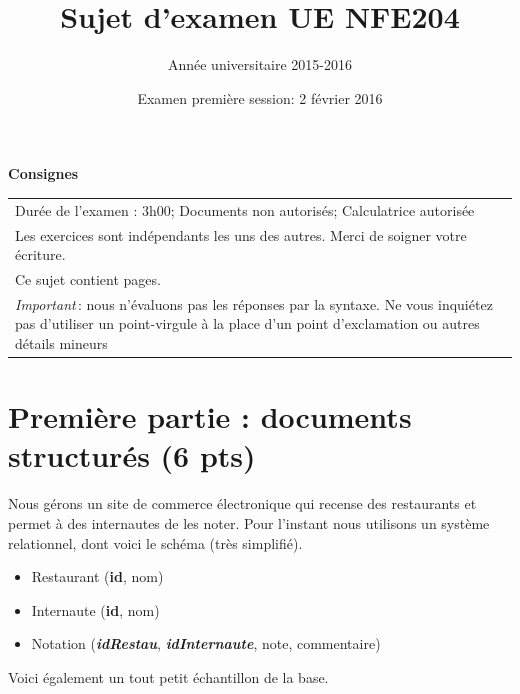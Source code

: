 \documentclass[10pt,a4paper]{article}
\begin{document}
\title{Sujet d'examen UE NFE204}
\author{Année universitaire 2015-2016}
\date{Examen première session: 2 février 2016}

\maketitle

\begin{center}
{\bf \Large Consignes}\\
\begin{tabular}{| p{15cm} |}
\hline
Dur\'ee de l'examen : 3h00; Documents non autoris\'es;  Calculatrice autoris\'ee\\

Les exercices sont indépendants les uns des autres. Merci de soigner votre écriture.\\
Ce sujet contient \pageref{LastPage} pages.\\

\textit{Important}\,: nous n'évaluons pas les réponses par la syntaxe. Ne vous
inquiétez pas d'utiliser un point-virgule à la place d'un point d'exclamation ou
autres détails mineurs
\\
\hline
\end{tabular}
\end{center}

\section*{Première partie : documents structurés (6 pts)}

Nous gérons un site de commerce électronique qui recense des restaurants
et permet à des internautes de les noter. Pour l'instant nous utilisons
un système relationnel, dont voici le schéma (très simplifié).

\begin{itemize}
  \item Restaurant   (\textbf{id}, nom)
  \item Internaute (\textbf{id}, nom)
  \item Notation (\textbf{\textit{idRestau}}, \textbf{\textit{idInternaute}}, note, commentaire)
\end{itemize}

\vspace*{0.2cm}

Voici également un tout petit échantillon de la base.
\end{document}
